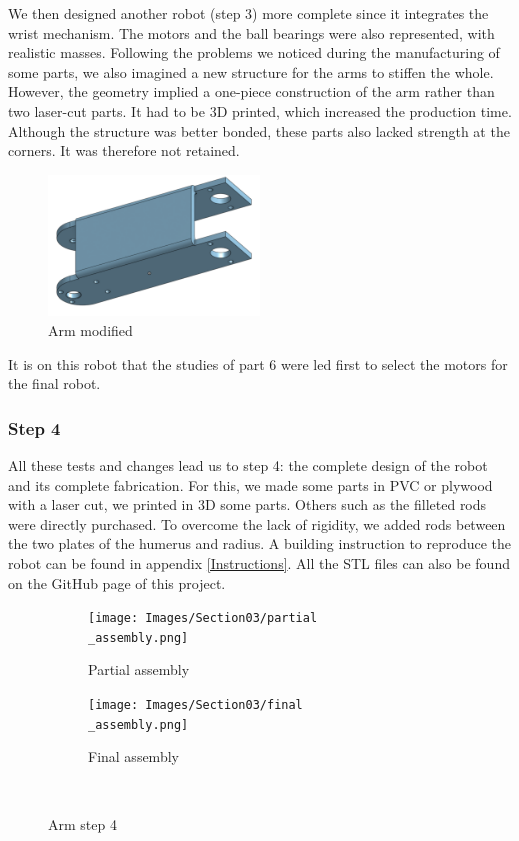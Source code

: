 We then designed another robot (step 3) more complete since it integrates the wrist mechanism. The motors and the ball bearings were also represented, with realistic masses. Following the problems we noticed during the manufacturing of some parts, we also imagined a new structure for the arms to stiffen the whole. However, the geometry implied a one-piece construction of the arm rather than two laser-cut parts. It had to be 3D printed, which increased the production time. Although the structure was better bonded, these parts also lacked strength at the corners. It was therefore not retained.
\begin{figure}[H]
    \centering
    \includegraphics[width=0.5\textwidth]{Images/Section03/Arm2.png}
    \caption{Arm modified}
    \label{fig:Arm2}
\end{figure}

It is on this robot that the studies of part 6 were led first to select the motors for the final robot. 

\subsubsection{Step 4}

All these tests and changes lead us to step 4: the complete design of the robot and its complete fabrication. For this, we made some parts in PVC or plywood with a laser cut, we printed in 3D some parts. Others such as the filleted rods were directly purchased. To overcome the lack of rigidity, we added rods between the two plates of the humerus and radius. A building instruction to reproduce the robot can be found in appendix \ref{Instructions}. All the STL files can also be found on the GitHub page of this project.
\begin{figure}[H]
    \begin{subfigure}{.5\linewidth}
        \centering
        \texttt{[image: Images/Section03/partial\\\_assembly.png]}
        \caption{Partial assembly}
        \label{fig:PA}
    \end{subfigure}%
    \begin{subfigure}{.5\linewidth}
        \centering
        \texttt{[image: Images/Section03/final\\\_assembly.png]}
        \caption{Final assembly}
        \label{fig:FA}
    \end{subfigure}\\[1ex]
    \caption{Arm step 4}
    \label{fig:AS4}
\end{figure}

